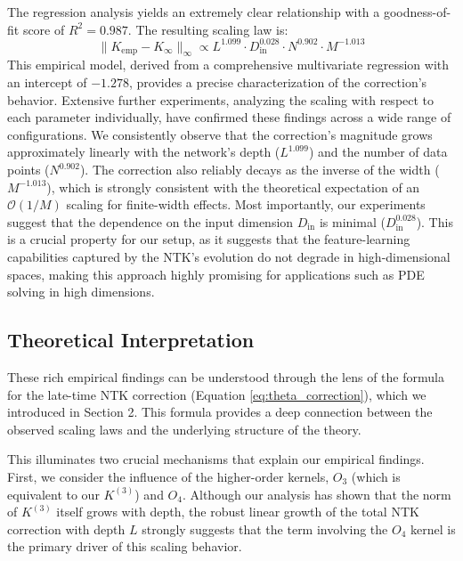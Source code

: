 \documentclass{article}
\begin{document}
The regression analysis yields an extremely clear relationship with a goodness-of-fit score of $R^2 = 0.987$. The resulting scaling law is:
\begin{equation}
    \|K_{\text{emp}} - K_{\infty}\|_\infty \propto L^{1.099} \cdot D_{\text{in}}^{0.028} \cdot N^{0.902} \cdot M^{-1.013}
    \label{eq:scaling_law}
\end{equation}
This empirical model, derived from a comprehensive multivariate regression with an intercept of $-1.278$, provides a precise characterization of the correction's behavior. Extensive further experiments, analyzing the scaling with respect to each parameter individually, have confirmed these findings across a wide range of configurations. We consistently observe that the correction's magnitude grows approximately linearly with the network's depth ($L^{1.099}$) and the number of data points ($N^{0.902}$). The correction also reliably decays as the inverse of the width ($M^{-1.013}$), which is strongly consistent with the theoretical expectation of an $\mathcal{O}(1/M)$ scaling for finite-width effects. Most importantly, our experiments suggest that the dependence on the input dimension $D_{\text{in}}$ is minimal ($D_{\text{in}}^{0.028}$). This is a crucial property for our setup, as it suggests that the feature-learning capabilities captured by the NTK's evolution do not degrade in high-dimensional spaces, making this approach highly promising for applications such as PDE solving in high dimensions.

\subsection{Theoretical Interpretation}

These rich empirical findings can be understood through the lens of the formula for the late-time NTK correction (Equation \ref{eq:theta_correction}), which we introduced in Section 2. This formula provides a deep connection between the observed scaling laws and the underlying structure of the theory.

This illuminates two crucial mechanisms that explain our empirical findings. First, we consider the influence of the higher-order kernels, $O_3$ (which is equivalent to our $K^{(3)}$) and $O_4$. Although our analysis has shown that the norm of $K^{(3)}$ itself grows with depth, the robust linear growth of the total NTK correction with depth $L$ strongly suggests that the term involving the $O_4$ kernel is the primary driver of this scaling behavior.
\end{document}
